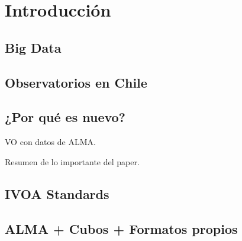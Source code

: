 \section{Introducción}
\subsection{Big Data}
\subsection{Observatorios en Chile}
\subsection{¿Por qué es nuevo?}
VO con datos de ALMA.

Resumen de lo importante del paper.

\subsection{IVOA Standards}
\subsection{ALMA + Cubos + Formatos propios}
